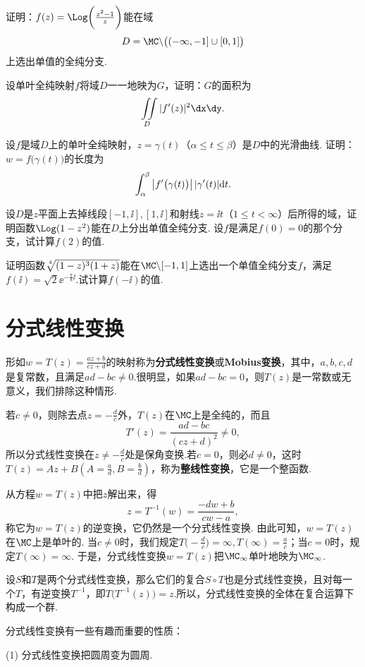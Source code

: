 \begin{xiti}
\item 证明：$f(z)=\Log\bigg(\frac{z^2-1}z\bigg)$能在域
\[D=\MC\backslash\big((-\infty,-1]\cup[0,1]\big)\]
上选出单值的全纯分支.
\item 设单叶全纯映射$f$将域$D$一一地映为$G$，证明：$G$的面积为
\[\iint\limits_D|f'(z)|^2\dx\dy.\]
\item 设$f$是域$D$上的单叶全纯映射，$z=\gamma(t)$（$\alpha\le t\le\beta$）是$D$中的光滑曲线. 证明：$w=f\big(\gamma(t)\big)$的长度为
    \[\int_\alpha^\beta\big|f'\big(\gamma(t)\big)\big|\,|\gamma'(t)|\textrm dt.\]
\item 设$D$是$z$平面上去掉线段$[-1,\ii],[1,\ii]$和射线$z=\ii t$（$1\le t<\infty$）后所得的域，证明函数$\Log(1-z^2)$能在$D$上分出单值全纯分支. 设$f$是满足$f(0)=0$的那个分支，试计算$f(2)$的值.
\item 证明函数$\sqrt[\leftroot{-1}\uproot{2}4]{(1-z)^3(1+z)}$能在$\MC\backslash[-1,1]$上选出一个单值全纯分支$f$，满足$f(\ii)=\sqrt2\ee^{-\frac\pi8\ii}$.试计算$f(-\ii)$的值.
\end{xiti}

\section{分式线性变换\label{sec2.5}}
形如$w=T(z)=\frac{az+b}{cz+d}$的映射称为\textbf{分式线性变换}或\textbf{Mobius变换}，其中，$a,b,c,d$是复常数，且满足$ad-bc\ne0$.很明显，如果$ad-bc=0$，则$T(z)$是一常数或无意义，我们排除这种情形.

若$c\ne0$，则除去点$z=-\frac dc$外，$T(z)$在$\MC$上是全纯的，而且
\[T'(z)=\frac{ad-bc}{(cz+d)^2}\ne0,\]
所以分式线性变换在$z\ne-\frac dc$处是保角变换.若$c=0$，则必$d\ne0$，这时$T(z)=Az+B\left(A=\frac ad,B=\frac bd\right)$，称为\textbf{整线性变换}，它是一个整函数.

从方程$w=T(z)$中把$z$解出来，得
\[z=T^{-1}(w)=\frac{-dw+b}{cw-a},\]
称它为$w=T(z)$的逆变换，它仍然是一个分式线性变换. 由此可知，$w=T(z)$在$\MC$上是单叶的. 当$c\ne0$时，我们规定$T\bigg(-\frac dc\bigg)=\infty,T(\infty)=\frac ac$；当$c=0$时，规定$T(\infty)=\infty$. 于是，分式线性变换$w=T(z)$把$\MC_\infty$单叶地映为$\MC_\infty$.

设$S$和$T$是两个分式线性变换，那么它们的复合$S\circ T$也是分式线性变换，且对每一个$T$，有逆变换$T^{-1}$，即$T\big(T^{-1}(z)\big)=z$.所以，分式线性变换的全体在复合运算下构成一个群.

分式线性变换有一些有趣而重要的性质：

(1) {\kaishu 分式线性变换把圆周变为圆周.}

